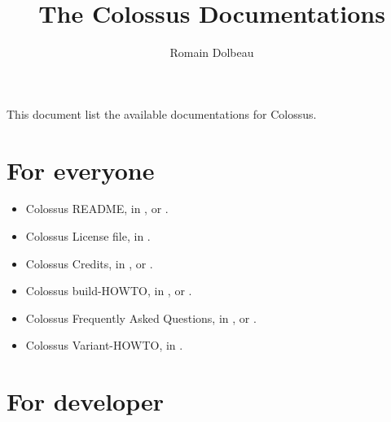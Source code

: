 \documentclass{article}
\begin{document}

\title{The Colossus Documentations}

\author{Romain Dolbeau}

\maketitle

This document list the available documentations for Colossus.

\section{For everyone}

\begin{itemize}

\item Colossus README, in ,  or .

\item Colossus License file, in .

\item Colossus Credits, in ,  or .

\item Colossus build-HOWTO, in ,  or .

\item Colossus Frequently Asked Questions, in ,  or .

\item Colossus Variant-HOWTO, in .

\end{itemize}

\section{For developer}
\end{document}
